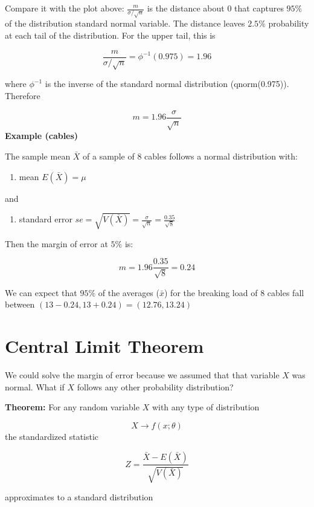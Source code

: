 \documentclass[
]{book}
\providecommand{\tightlist}{%
  \setlength{\itemsep}{0pt}\setlength{\parskip}{0pt}}
\begin{document}
Compare it with the plot above: \(\frac{m}{\sigma/\sqrt{n}}\) is the distance about \(0\) that captures \(95\%\) of the distribution standard normal variable. The distance leaves \(2.5\%\) probability at each tail of the distribution. For the upper tail, this is

\[\frac{m}{\sigma/\sqrt{n}}=\phi^{-1}(0.975)=1.96\]

where \(\phi^{-1}\) is the inverse of the standard normal distribution (qnorm(0.975)). Therefore

\[m=1.96 \frac{\sigma}{\sqrt{n}}\]
\textbf{Example (cables)}

The sample mean \(\bar{X}\) of a sample of \(8\) cables follows a normal distribution with:

\begin{enumerate}
\def\labelenumi{\arabic{enumi}.}
\tightlist
\item
  mean \(E(\bar{X})=\mu\)
\end{enumerate}

and

\begin{enumerate}
\def\labelenumi{\arabic{enumi}.}
\setcounter{enumi}{1}
\tightlist
\item
  standard error \(se=\sqrt{V(\bar{X})}=\frac{\sigma}{\sqrt{n}}=\frac{0.35}{\sqrt{8}}\)
\end{enumerate}

Then the margin of error at \(5\%\) is:

\[m=1.96\frac{0.35}{\sqrt{8}}=0.24\]

We can expect that \(95\%\) of the averages (\(\bar{x}\)) for the breaking load of \(8\) cables fall between \((13-0.24, 13+0.24)=(12.76, 13.24)\)

\hypertarget{central-limit-theorem-1}{%
\section{Central Limit Theorem}\label{central-limit-theorem-1}}

We could solve the margin of error because we assumed that that variable \(X\) was normal. What if \(X\) follows any other probability distribution?

\textbf{Theorem:} For any random variable \(X\) with any type of distribution

\[X \rightarrow f(x; \theta)\]
the standardized statistic

\[Z=\frac{\bar{X}-E(\bar{X})}{\sqrt{V(\bar{X})}}\]

approximates to a standard distribution
\end{document}
